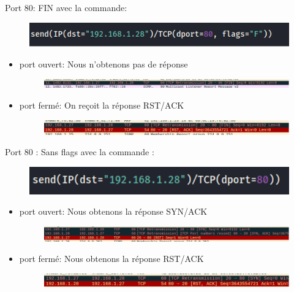 \documentclass[12pt, oneside]{article}
\begin{document}
Port 80: FIN avec la commande:
\begin{figure}[H]
\centering
\includegraphics[scale=0.7]{14}
\end{figure}
\begin{itemize}
\item port ouvert: Nous n’obtenons pas de réponse
\begin{figure}[H]
\centering
\includegraphics[scale=0.7]{15}
\end{figure}
\item port fermé: On reçoit la réponse RST/ACK
\begin{figure}[H]
\centering
\includegraphics[scale=0.7]{16}
\end{figure}
\end{itemize}

Port 80 : Sans flags avec la commande : 
\begin{figure}[H]
\centering
\includegraphics[scale=0.7]{17}
\end{figure}
\begin{itemize}
\item port ouvert: Nous obtenons la réponse SYN/ACK
\begin{figure}[H]
\centering
\includegraphics[scale=0.7]{18}
\end{figure}
\item port fermé: Nous obtenons la réponse RST/ACK
\begin{figure}[H]
\centering
\includegraphics[scale=0.7]{19}
\end{figure}
\end{itemize}
\end{document}
